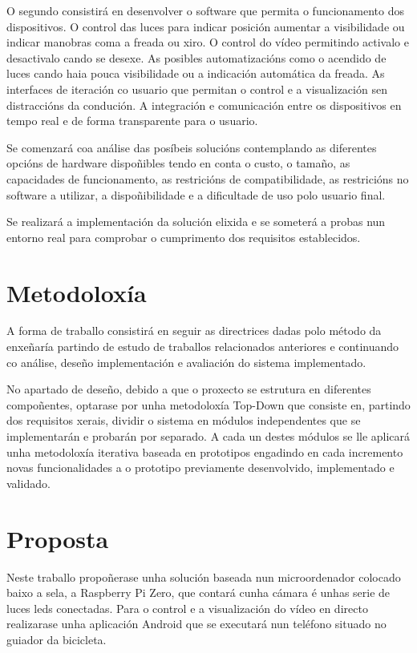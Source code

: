 O segundo consistirá en desenvolver o software que permita o funcionamento dos dispositivos. O control das luces para indicar posición aumentar a visibilidade ou indicar manobras coma a freada ou xiro. O control do vídeo permitindo activalo e desactivalo cando se desexe. As posibles automatizacións como o acendido de luces cando haia pouca visibilidade ou a indicación automática da freada. As interfaces de iteración co usuario que permitan o control e a visualización sen distraccións da condución. A integración e comunicación entre os dispositivos en tempo real e de forma transparente para o usuario.

Se comenzará coa análise das posíbeis solucións contemplando as diferentes opcións de hardware dispoñibles tendo en conta o custo, o tamaño, as capacidades de funcionamento, as restricións de compatibilidade, as restricións no software a utilizar, a dispoñibilidade e a dificultade de uso polo usuario final.

Se realizará a implementación da solución elixida e se someterá a probas nun entorno real para comprobar o cumprimento dos requisitos establecidos.


\section{Metodoloxía}
A forma de traballo consistirá en seguir as directrices dadas polo método da enxeñaría partindo de estudo de traballos relacionados anteriores e continuando co análise, deseño implementación e avaliación do sistema implementado.

No apartado de deseño, debido a que o proxecto se estrutura en diferentes compoñentes, optarase por unha metodoloxía Top-Down que consiste en, partindo dos requisitos xerais, dividir o sistema en módulos independentes que se implementarán e probarán por separado. A cada un destes módulos se lle aplicará unha metodoloxía iterativa baseada en prototipos engadindo en cada incremento novas funcionalidades a o prototipo previamente desenvolvido, implementado e validado.

\section{Proposta}
Neste traballo propoñerase unha solución baseada nun microordenador colocado baixo a sela, a Raspberry Pi Zero, que contará cunha cámara é unhas serie de luces leds conectadas. Para o control e a visualización do vídeo en directo realizarase unha aplicación Android que se executará nun teléfono situado no guiador da bicicleta.


